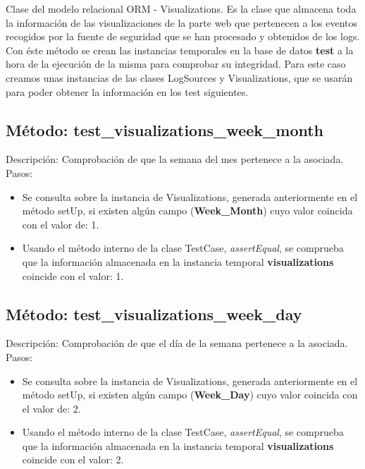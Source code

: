 Clase del modelo relacional ORM - Visualizations. Es la clase que almacena toda la información de las visualizaciones de la parte web que pertenecen a los eventos recogidos por la fuente de seguridad que se han procesado y obtenidos de los logs.\\

Con éste método se crean las instancias temporales en la base de datos \textbf{test} a la hora de la ejecución de la misma para comprobar su integridad. Para este caso creamos unas instancias de las clases LogSources y Visualizations, que se usarán para poder obtener la información en los test siguientes.\\



\subsection{\quad Método: test\_visualizations\_week\_month}

Descripción: Comprobación de que la semana del mes pertenece a la asociada.\\
Pasos:
\begin{itemize}
\item Se consulta sobre la instancia de Visualizations, generada anteriormente en el método setUp, si existen algún campo (\textbf{Week\_Month}) cuyo valor coincida con el valor de: 1.
\item Usando el método interno de la clase TestCase, \emph{assertEqual}, se comprueba que la información almacenada en la instancia temporal \textbf{visualizations} coincide con el valor: 1.
\end{itemize}



\subsection{\quad Método: test\_visualizations\_week\_day}

Descripción: Comprobación de que el día de la semana pertenece a la asociada.\\
Pasos:
\begin{itemize}
\item Se consulta sobre la instancia de Visualizations, generada anteriormente en el método setUp, si existen algún campo (\textbf{Week\_Day}) cuyo valor coincida con el valor de: 2.
\item Usando el método interno de la clase TestCase, \emph{assertEqual}, se comprueba que la información almacenada en la instancia temporal \textbf{visualizations} coincide con el valor: 2.
\end{itemize}

